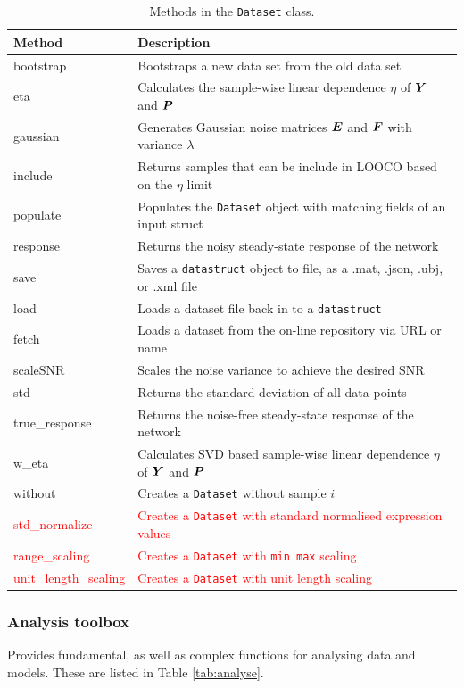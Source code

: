 \begin{bibunit}
\begin{table}[htb]
\caption{\label{tab:dataset}
Methods in the \texttt{Dataset} class.}
\centering
\begin{tabular}{|l|p{10cm}|}
\hline
Method & Description\\
\hline
bootstrap & Bootstraps a new data set from the old data set\\
eta & Calculates the sample-wise linear dependence \(\eta\) of \({\boldsymbol{Y}}\) and \({\boldsymbol{P}}\)\\
gaussian & Generates Gaussian noise matrices \({\boldsymbol{E}}\) and \({\boldsymbol{F}}\) with variance \(\lambda\)\\
include & Returns samples that can be include in LOOCO based on the \(\eta\) limit\\
populate & Populates the \texttt{Dataset} object with matching fields of an input struct\\
response & Returns the noisy steady-state response of the network\\
save & Saves a \texttt{datastruct} object to file, as a .mat, .json, .ubj, or .xml file\\
load & Loads a dataset file back in to a \texttt{datastruct}\\
fetch & Loads a dataset from the on-line repository via URL or name\\
scaleSNR & Scales the noise variance to achieve the desired SNR\\
std & Returns the standard deviation of all data points\\
true\_response & Returns the noise-free steady-state response of the network\\
w\_eta & Calculates SVD based sample-wise linear dependence \(\eta\) of \({\boldsymbol{Y}}\) and \({\boldsymbol{P}}\)\\
without & Creates a \texttt{Dataset} without sample \(i\)\\
\textcolor{red}{std\_normalize }& \textcolor{red}{Creates a \texttt{Dataset} with standard normalised expression values}\\
\textcolor{red}{range\_scaling} & \textcolor{red}{Creates a \texttt{Dataset} with \texttt{min max} scaling}\\
\textcolor{red}{unit\_length\_scaling} & \textcolor{red}{Creates a \texttt{Dataset} with unit length  scaling}\\
\hline
\end{tabular}
\end{table}

\subsubsection{Analysis toolbox}
\label{sec:analysis_toolbox}
Provides fundamental, as well as complex functions for analysing data and models.
These are listed in Table \ref{tab:analyse}.


\end{bibunit}
